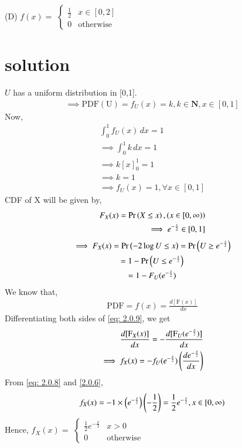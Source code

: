\documentclass[journal,12pt,twocolumn]{IEEEtran}
\begin{document}
(D) $f(x)=$
$\begin{cases}
\frac{1}{2} & x\in [0,2]\\
0 & \mathrm{otherwise}
\end{cases}$
\section{solution}
$U$ has a uniform distribution in [0,1].
\begin{align}
    \implies \mathrm{PDF(U)}=f_U(x)=k, k\in\textbf{N}, x\in[0,1]
\end{align}
Now,
\begin{align}
    \int_{0}^1 f_U(x)\,dx=1\\
    \implies \int_0^1 k\,dx=1\\
    \implies k[x]_0^1=1\\
    \implies k=1\\
    \implies f_U(x)=1, \forall x\in[0,1]\label{2.0.6}
\end{align}
CDF of X will be given by,
\begin{align}
F_{X}(x) = \Pr\left(X\leq x\right),  \left(x\in[0,\infty)\right)\\
\implies e^{-\frac{x}{2}}\in [0,1]\label{eq: 2.0.8}
\end{align}
\begin{multline}
    \implies F_X(x)  =\Pr\left(-2\log U\leq x\right) 
    =\Pr\left(U\geq e^{-\frac{x}{2}}\right)\\
    =1-\Pr\left(U\leq e^{-\frac{x}{2}}\right)\\
    =1-F_{U}(e^{-\frac{x}{2}})\label{eq: 2.0.9}
    \end{multline}
We know that,
\begin{align}
    \mathrm{PDF}=f(x)=\frac{d[\mathrm{F}(x)]}{dx}
\end{align}
Differentiating both sides of \eqref{eq: 2.0.9}, we get
\begin{align}
    \frac{d[\mathrm{F}_X(x)]}{dx}=-\frac{d[\mathrm{F}_U(e^{-\frac{x}{2}})]}{dx}\label{eq: 2.0.3}\\
    \implies f_{X}(x)=-f_{U}(e^{-\frac{x}{2}})\left(\frac{de^{-\frac{x}{2}}}{dx}\right)
    \end{align}
  From \eqref{eq: 2.0.8} and \eqref{2.0.6},
  \begin{align}
      f_X(x)=-1\times \left(e^{-\frac{x}{2}}\right)\left(-\frac{1}{2}\right)=\frac{1}{2}e^{-\frac{x}{2}},x\in[0,\infty)
  \end{align}
  Hence,
  $f_X(x)=$
$\begin{cases}
\frac{1}{2}e^{-\frac{x}{2}} & x>0\\
0 & \mathrm{otherwise}
\end{cases}$
\end{document}
